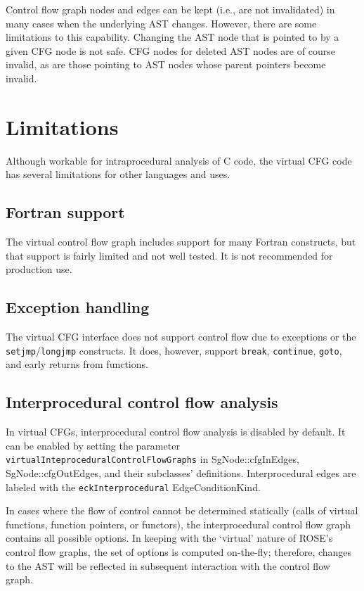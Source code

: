 Control flow graph nodes and edges can be kept (i.e., are not invalidated)
in many cases when the underlying AST changes.  However, there are some
limitations to this capability.  Changing the AST node that is pointed to
by a given CFG node is not safe.  CFG nodes for deleted AST nodes are of
course invalid, as are those pointing to AST nodes whose parent pointers
become invalid.

\section{Limitations}

Although workable for intraprocedural analysis of C code, the virtual CFG
code has several limitations for other languages and uses.

\subsection{Fortran support}

The virtual control flow graph includes support for many Fortran
constructs, but that support is fairly limited and not well tested.  It is
not recommended for production use.

\subsection{Exception handling}

The virtual CFG interface does not support control flow due to exceptions
or the \lstinline{setjmp}/\lstinline{longjmp} constructs.
It does, however, support \lstinline{break}, \lstinline{continue},
\lstinline{goto}, and early returns from functions.

\subsection{Interprocedural control flow analysis}

In virtual CFGs, interprocedural control flow analysis is disabled by default. It can be enabled
by setting the parameter \texttt{virtualInteproceduralControlFlowGraphs} in SgNode::cfgInEdges, 
SgNode::cfgOutEdges, and their subclasses' definitions. Interprocedural edges are labeled 
with the \texttt{eckInterprocedural} EdgeConditionKind.

In cases where the flow of control cannot be determined statically (calls of virtual
functions, function pointers, or functors), the interprocedural control flow
graph contains all possible options. In keeping with the `virtual' nature of
ROSE's control flow graphs, the set of options is computed on-the-fly;
therefore, changes to the AST will be reflected in subsequent interaction with
the control flow graph.  


